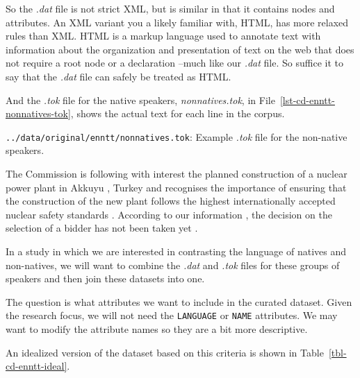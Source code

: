 \documentclass[
  letterpaper,
  DIV=11,
  numbers=noendperiod]{scrreport}
\newenvironment{Shaded}{\begin{snugshade}}{\end{snugshade}}
\newcommand{\NormalTok}[1]{\textcolor[rgb]{0.00,0.00,0.00}{#1}}
\theoremstyle{definition}
\theoremstyle{remark}
\begin{document}
So the \emph{.dat} file is not strict XML, but is similar in that it
contains nodes and attributes. An XML variant you a likely familiar
with, HTML, has more relaxed rules than XML. HTML is a markup language
used to annotate text with information about the organization and
presentation of text on the web that does not require a root node or a
declaration --much like our \emph{.dat} file. So suffice it to say that
the \emph{.dat} file can safely be treated as HTML.

And the \emph{.tok} file for the native speakers, \emph{nonnatives.tok},
in File~\ref{lst-cd-enntt-nonnatives-tok}, shows the actual text for
each line in the corpus.

\begin{codelisting}

\caption{\texttt{../data/original/enntt/nonnatives.tok}: Example
\emph{.tok} file for the non-native speakers.}

\hypertarget{lst-cd-enntt-nonnatives-tok}{%
\label{lst-cd-enntt-nonnatives-tok}}%
\begin{Shaded}
\begin{Highlighting}[]
\NormalTok{The Commission is following with interest the planned construction of a nuclear power plant in Akkuyu , Turkey and recognises the importance of ensuring that the construction of the new plant follows the highest internationally accepted nuclear safety standards . }
\NormalTok{According to our information , the decision on the selection of a bidder has not been taken yet .}
\end{Highlighting}
\end{Shaded}

\end{codelisting}

In a study in which we are interested in contrasting the language of
natives and non-natives, we will want to combine the \emph{.dat} and
\emph{.tok} files for these groups of speakers and then join these
datasets into one.

The question is what attributes we want to include in the curated
dataset. Given the research focus, we will not need the
\texttt{LANGUAGE} or \texttt{NAME} attributes. We may want to modify the
attribute names so they are a bit more descriptive.

An idealized version of the dataset based on this criteria is shown in
Table~\ref{tbl-cd-enntt-ideal}.
\end{document}
